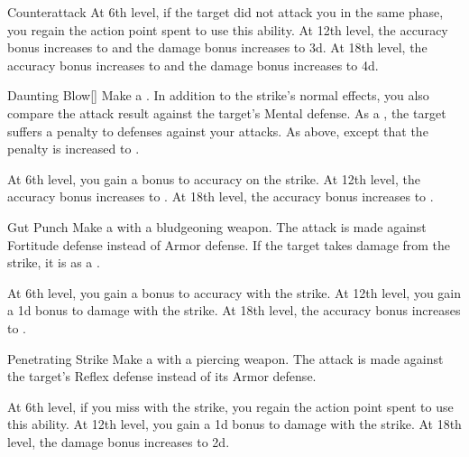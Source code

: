 {\begin{ability}{Counterattack}
                At 6th level, if the target did not attack you in the same phase, you regain the action point spent to use this ability.
                At 12th level, the accuracy bonus increases to  and the damage bonus increases to \plus3d.
                At 18th level, the accuracy bonus increases to  and the damage bonus increases to \plus4d.
            \end{ability}

            \begin{ability}{Daunting Blow}[]
                Make a .
                In addition to the strike's normal effects, you also compare the attack result against the target's Mental defense.
                \hit As a , the target suffers a  penalty to defenses against your attacks.
                \crit As above, except that the penalty is increased to .

                At 6th level, you gain a  bonus to accuracy on the strike.
                At 12th level, the accuracy bonus increases to .
                At 18th level, the accuracy bonus increases to .
            \end{ability}

            \begin{ability}{Gut Punch}
                Make a  with a bludgeoning weapon.
                The attack is made against Fortitude defense instead of Armor defense.
                If the target takes damage from the strike, it is \sickened as a .

                At 6th level, you gain a  bonus to accuracy with the strike.
                At 12th level, you gain a \plus1d bonus to damage with the strike.
                At 18th level, the accuracy bonus increases to .
            \end{ability}

            \begin{ability}{Penetrating Strike}
                Make a  with a piercing weapon.
                The attack is made against the target's Reflex defense instead of its Armor defense.

                At 6th level, if you miss with the strike, you regain the action point spent to use this ability.
                At 12th level, you gain a \plus1d bonus to damage with the strike.
                At 18th level, the damage bonus increases to \plus2d.
            \end{ability}

}
